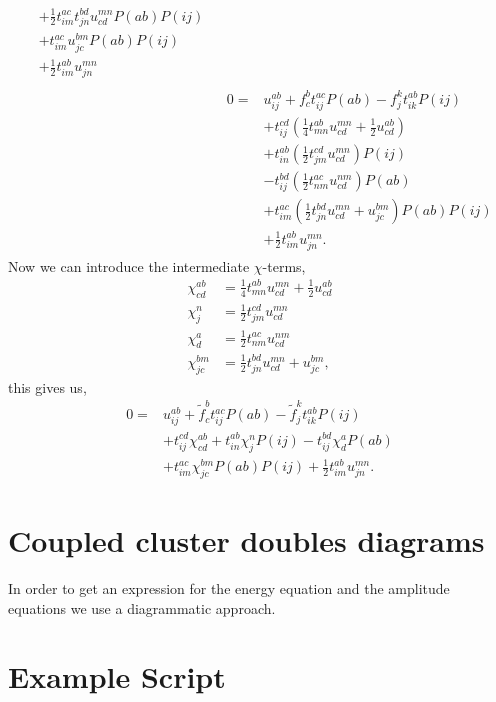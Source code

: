 \documentclass[
    a4paper, aps, twocolumn, floatfix, superscriptaddress,
    nofootinbib]{revtex4-1}
\newcommand{\1}{\mathds{1}}
\begin{document}
\begin{align}
\begin{aligned}
          &+ \frac{1}{2}t^{ac}_{im} t^{bd}_{jn} u^{mn}_{cd} P(ab) P(ij) \\
          &+ t^{ac}_{im} u^{bm}_{jc} P(ab) P(ij) \\
          &+ \frac{1}{2}t^{ab}_{im} u^{mn}_{jn}
        \end{aligned} \\
        &\begin{aligned}
        0 =& u^{ab}_{ij} + f^b_c t^{ac}_{ij}P(ab) - f^k_jt^{ab}_{ik}P(ij) \\
          &+ t^{cd}_{ij} \left(\frac{1}{4}t^{ab}_{mn} u^{mn}_{cd} + \frac{1}{2} u^{ab}_{cd} \right) \\
          &+  t^{ab}_{in} \left(\frac{1}{2} t^{cd}_{jm} u^{mn}_{cd}\right) P(ij) \\
          &- t^{bd}_{ij} \left(\frac{1}{2}t^{ac}_{nm}  u^{nm}_{cd}\right) P(ab) \\
          &+ t^{ac}_{im}\left(\frac{1}{2} t^{bd}_{jn} u^{mn}_{cd} + u^{bm}_{jc} \right)P(ab) P(ij) \\
          &+ \frac{1}{2}t^{ab}_{im} u^{mn}_{jn}.
        \end{aligned}
    \end{align}
    Now we can introduce the intermediate $\chi$-terms,
    \begin{align}
        \chi^{ab}_{cd} &= \frac{1}{4}t^{ab}_{mn} u^{mn}_{cd} + \frac{1}{2}u^{ab}_{cd} \\
        \chi^n_j &= \frac{1}{2}t^{cd}_{jm} u^{mn}_{cd} \\
        \chi^a_d &= \frac{1}{2} t^{ac}_{nm} u^{nm}_{cd} \\
        \chi^{bm}_{jc} &= \frac{1}{2}t^{bd}_{jn}u^{mn}_{cd} + u^{bm}_{jc},
    \end{align}
    this gives us,
    \begin{equation}
        \begin{aligned}
            0 =& u^{ab}_{ij} + \tilde{f}^b_c t^{ac}_{ij}P(ab) - \tilde{f}^k_jt^{ab}_{ik}P(ij) \\
              &+ t^{cd}_{ij}\chi^{ab}_{cd} + t^{ab}_{in}\chi^n_jP(ij)
               - t^{bd}_{ij}\chi^a_dP(ab) \\
              &+ t^{ac}_{im}\chi^{bm}_{jc}P(ab)P(ij) + \frac{1}{2}t^{ab}_{im}u^{mn}_{jn}.
        \end{aligned}
    \end{equation}

\section{Coupled cluster doubles diagrams}
    In order to get an expression for the energy equation and the amplitude
    equations we use a diagrammatic approach.

\section{Example Script}

    \label{app:sample_script}

    \vspace{10pt}
    \begin{widetext}
    \inputminted[]{python}{../scripts/comparison.py}
    \end{widetext}


\end{document}
